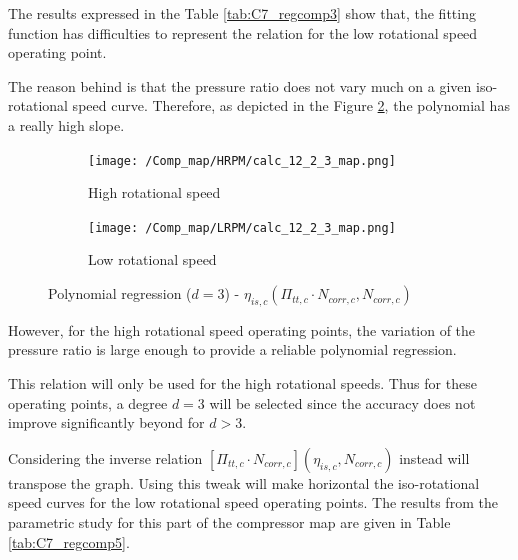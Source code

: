 The results expressed in the Table \ref{tab:C7_regcomp3} show that, the fitting function has difficulties to represent the relation for the low rotational speed operating point. 

The reason behind is that the pressure ratio does not vary much on a given iso-rotational speed curve. Therefore, as depicted in the Figure \ref{fig:C7_polycomp_eta1_LRPM}, the polynomial has a really high slope.  

\begin{figure}[H]
    \centering
    \begin{subfigure}[b]{0.4\textwidth}
        \centering
        \texttt{[image: /Comp\_map/HRPM/calc\_12\_2\_3\_map.png]}
        \caption{High rotational speed}
        \label{fig:C7_polycomp_eta1_HRPM}
    \end{subfigure}
    \begin{subfigure}[b]{0.4\textwidth}
        \centering
        \texttt{[image: /Comp\_map/LRPM/calc\_12\_2\_3\_map.png]}
        \caption{Low rotational speed}
        \label{fig:C7_polycomp_eta1_LRPM}
    \end{subfigure}
    \caption{Polynomial regression ($d=3$) - $\eta_{is,c}(\Pi_{tt,c}\cdot N_{corr,c},N_{corr,c})$} \label{fig:C7_polycomp_eta1}
\end{figure}

However, for the high rotational speed operating points, the variation of the pressure ratio is large enough to provide a reliable polynomial regression. 

This relation will only be used for the high rotational speeds. Thus for these operating points, a degree $d=3$ will be selected since the accuracy does not improve significantly beyond for $d>3$.

Considering the inverse relation $[\Pi_{tt,c}\cdot N_{corr,c}](\eta_{is,c},N_{corr,c})$ instead will transpose the graph. Using this tweak will make horizontal the iso-rotational speed curves for the low rotational speed operating points. The results from the parametric study for this part of the compressor map are given in Table \ref{tab:C7_regcomp5}. 



